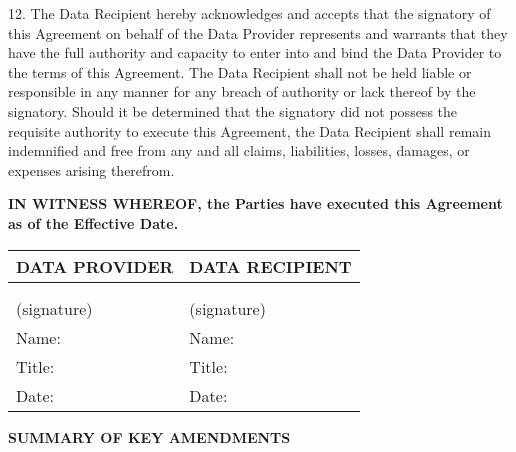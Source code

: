 
12. The Data Recipient hereby acknowledges and accepts that the signatory of this Agreement on behalf of the Data Provider represents and warrants that they have the full authority and capacity to enter into and bind the Data Provider to the terms of this Agreement. The Data Recipient shall not be held liable or responsible in any manner for any breach of authority or lack thereof by the signatory. Should it be determined that the signatory did not possess the requisite authority to execute this Agreement, the Data Recipient shall remain indemnified and free from any and all claims, liabilities, losses, damages, or expenses arising therefrom.

\vspace{0.5cm}

\textbf{IN WITNESS WHEREOF, the Parties have executed this Agreement as of the  Effective Date.}

\vspace{1cm}

\begin{tabular}{|p{}|p{}|}
\hline
\textbf{DATA PROVIDER} & \textbf{DATA RECIPIENT} \\
\hline
 & \\
 & \\
\hline
(signature) & (signature) \\
\hline
Name: & Name: \\
\hline
Title: & Title: \\
\hline
Date: & Date: \\
\hline
\end{tabular}

\vspace{2cm}

\begin{center}
\textbf{\Large SUMMARY OF KEY AMENDMENTS}
\end{center}

